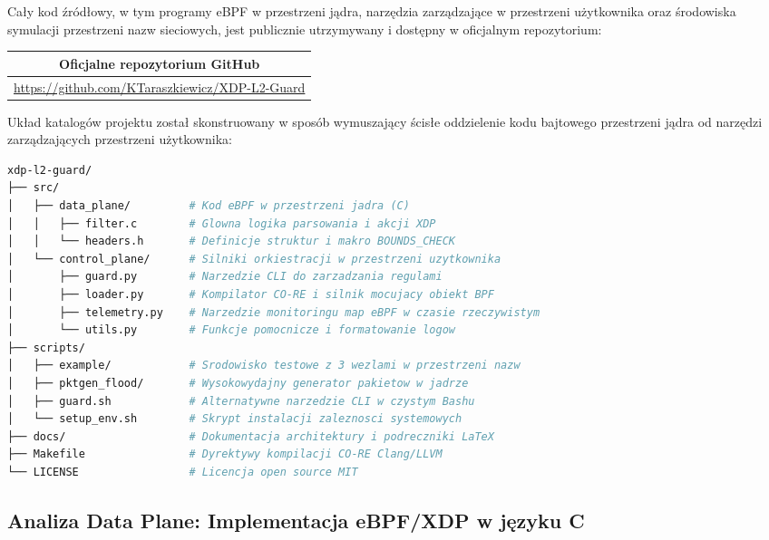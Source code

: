 \documentclass[11pt,a4paper]{article}
\begin{document}
Cały kod źródłowy, w tym programy eBPF w przestrzeni jądra, narzędzia zarządzające w przestrzeni użytkownika oraz środowiska symulacji przestrzeni nazw sieciowych, jest publicznie utrzymywany i dostępny w oficjalnym repozytorium:

\vspace{0.5cm}
\begin{table}[H]
\centering
\begin{tabular}{|c|}
\hline
\textbf{Oficjalne repozytorium GitHub} \\
\hline
\url{https://github.com/KTaraszkiewicz/XDP-L2-Guard} \\
\hline
\end{tabular}
\end{table}
\vspace{0.5cm}

\noindent Układ katalogów projektu został skonstruowany w sposób wymuszający ścisłe oddzielenie kodu bajtowego przestrzeni jądra od narzędzi zarządzających przestrzeni użytkownika:

\begin{lstlisting}[language=bash, title={Struktura katalogow projektu}, breaklines=false, basicstyle=\ttfamily\scriptsize]
xdp-l2-guard/
├── src/
│   ├── data_plane/         # Kod eBPF w przestrzeni jadra (C)
│   │   ├── filter.c        # Glowna logika parsowania i akcji XDP
│   │   └── headers.h       # Definicje struktur i makro BOUNDS_CHECK
│   └── control_plane/      # Silniki orkiestracji w przestrzeni uzytkownika
│       ├── guard.py        # Narzedzie CLI do zarzadzania regulami
│       ├── loader.py       # Kompilator CO-RE i silnik mocujacy obiekt BPF
│       ├── telemetry.py    # Narzedzie monitoringu map eBPF w czasie rzeczywistym
│       └── utils.py        # Funkcje pomocnicze i formatowanie logow
├── scripts/
│   ├── example/            # Srodowisko testowe z 3 wezlami w przestrzeni nazw
│   ├── pktgen_flood/       # Wysokowydajny generator pakietow w jadrze
│   ├── guard.sh            # Alternatywne narzedzie CLI w czystym Bashu
│   └── setup_env.sh        # Skrypt instalacji zaleznosci systemowych
├── docs/                   # Dokumentacja architektury i podreczniki LaTeX
├── Makefile                # Dyrektywy kompilacji CO-RE Clang/LLVM
└── LICENSE                 # Licencja open source MIT
\end{lstlisting}

\subsection{Analiza Data Plane: Implementacja eBPF/XDP w języku C}
\end{document}
